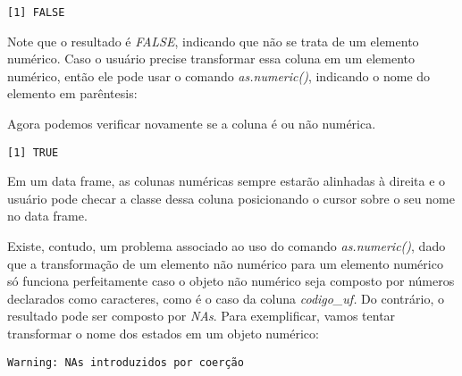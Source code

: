 \documentclass[
  letterpaper,
  DIV=11,
  numbers=noendperiod]{scrreprt}
\newenvironment{Shaded}{\begin{snugshade}}{\end{snugshade}}
\newcommand{\FunctionTok}[1]{\textcolor[rgb]{0.28,0.35,0.67}{#1}}
\newcommand{\NormalTok}[1]{\textcolor[rgb]{0.00,0.23,0.31}{#1}}
\newcommand{\OtherTok}[1]{\textcolor[rgb]{0.00,0.23,0.31}{#1}}
\newcommand{\SpecialCharTok}[1]{\textcolor[rgb]{0.37,0.37,0.37}{#1}}
\begin{document}
\begin{verbatim}
[1] FALSE
\end{verbatim}

Note que o resultado é \emph{FALSE}, indicando que não se trata de um
elemento numérico. Caso o usuário precise transformar essa coluna em um
elemento numérico, então ele pode usar o comando \emph{as.numeric()},
indicando o nome do elemento em parêntesis:

\begin{Shaded}
\end{Shaded}

Agora podemos verificar novamente se a coluna é ou não numérica.

\begin{Shaded}
\end{Shaded}

\begin{verbatim}
[1] TRUE
\end{verbatim}

Em um data frame, as colunas numéricas sempre estarão alinhadas à
direita e o usuário pode checar a classe dessa coluna posicionando o
cursor sobre o seu nome no data frame.

Existe, contudo, um problema associado ao uso do comando
\emph{as.numeric()}, dado que a transformação de um elemento não
numérico para um elemento numérico só funciona perfeitamente caso o
objeto não numérico seja composto por números declarados como
caracteres, como é o caso da coluna \emph{codigo\_uf.} Do contrário, o
resultado pode ser composto por \emph{NAs}. Para exemplificar, vamos
tentar transformar o nome dos estados em um objeto numérico:

\begin{Shaded}
\end{Shaded}

\begin{verbatim}
Warning: NAs introduzidos por coerção
\end{verbatim}
\end{document}
